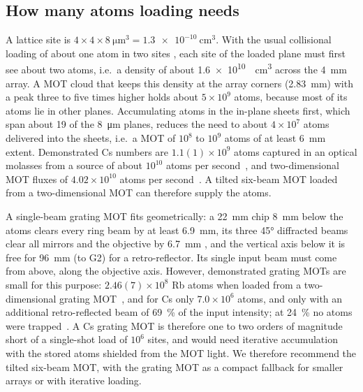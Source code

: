 \documentclass[11pt]{article}
\begin{document}
\subsection{How many atoms loading needs}

A lattice site is $4\times4\times\SI{8}{\micro\metre\cubed} = \SI{1.3e-10}{\centi\metre\cubed}$. With the
usual collisional loading of about one atom in two sites , each site of the loaded plane must first see about two atoms, i.e.\ a
density of about \SI{1.6e10}{\per\centi\metre\cubed} across the \SI{4}{\milli\metre} array. A MOT cloud
that keeps this density at the array corners (\SI{2.83}{\milli\metre}) with a peak three to five times
higher holds about $5\times10^{9}$ atoms, because most of its atoms lie in other planes. Accumulating
atoms in the in-plane sheets first, which span about 19 of the \SI{8}{\micro\metre} planes, reduces the
need to about $4\times10^{7}$ atoms delivered into the sheets, i.e.\ a MOT of $10^{8}$ to $10^{9}$ atoms
of at least \SI{6}{\milli\metre} extent. Demonstrated Cs numbers are $1.1(1)\times10^{9}$ atoms captured
in an optical molasses from a source of about $10^{10}$ atoms per second~\cite{DonleyNIST}, and
two-dimensional MOT fluxes of $4.02\times10^{10}$ atoms per second~\cite{Huang2016}. A tilted six-beam
MOT loaded from a two-dimensional MOT can therefore supply the atoms.

A single-beam grating MOT fits geometrically: a \SI{22}{\milli\metre} chip \SI{8}{\milli\metre} below
the atoms clears every ring beam by at least \SI{6.9}{\milli\metre}, its three \ang{45} diffracted beams
clear all mirrors and the objective by \SI{6.7}{\milli\metre}
, and the vertical axis below it is
free for \SI{96}{\milli\metre} (to G2) for a retro-reflector. Its single input beam must come from above,
along the objective axis. However, demonstrated grating MOTs are small for this purpose:
$2.46(7)\times10^{8}$ Rb atoms when loaded from a two-dimensional grating MOT~\cite{Imhof2017}, and for
Cs only $7.0\times10^{6}$ atoms, and only with an additional retro-reflected beam of \SI{69}{\percent}
of the input intensity; at \SI{24}{\percent} no atoms were trapped~\cite{Takamizawa2025}. A Cs grating MOT
is therefore one to two orders of magnitude short of a single-shot load of $10^{6}$ sites, and would need
iterative accumulation with the stored atoms shielded from the MOT light. We therefore recommend the
tilted six-beam MOT, with the grating MOT as a compact fallback for smaller arrays or with iterative
loading.
\end{document}
